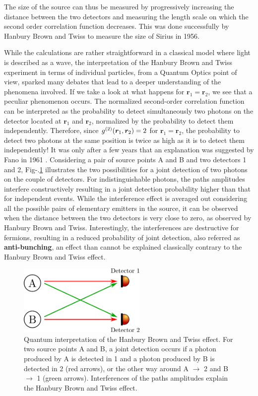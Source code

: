 \noindent The size of the source can thus be measured by progressively increasing the distance between the two detectors and measuring the length scale on which the second order correlation function decreases. This was done successfully by Hanbury Brown and Twiss \cite{brown1956test} to measure the size of Sirius in 1956.

While the calculations are rather straightforward in a classical model where light is described as a wave, the interpretation of the Hanbury Brown and Twiss experiment in terms of individual particles, \ie from a Quantum Optics point of view, sparked many debates that lead to a deeper understanding of the phenomena involved. If we take a look at what happens for $\bm{r}_1=\bm{r}_2$, we see that a peculiar phenomenon occurs. The normalized second-order correlation function can be interpreted as the probability to detect simultaneously two photons on the detector located at $\bm{r}_1$ and $\bm{r}_2$, normalized by the probability to detect them independently. Therefore, since $g^{(2)} (\bm{r}_1,\bm{r}_2)=2$ for $\bm{r}_1=\bm{r}_2$, the probability to detect two photons at the same position is twice as high as it is to detect them independently! It was only after a few years that an explanation was suggested by Fano in 1961 \cite{fano1961quantum}. Considering a pair of source points A and B and two detectors 1 and 2, Fig-.\ref{fig:HBT_scheme} illustrates the two possibilities for a joint detection of two photons on the couple of detectors. For indistinguishable photons, the paths amplitudes interfere constructively resulting in a joint detection probability higher than that for independent events. While the interference effect is averaged out considering all the possible pairs of elementary emitters in the source, it can be observed when the distance between the two detectors is very close to zero, as observed by Hanbury Brown and Twiss. Interestingly, the interferences are destructive for fermions, resulting in a reduced probability of joint detection, also referred as \textbf{anti-bunching}, an effect than cannot be explained classically contrary to the Hanbury Brown and Twiss effect. 

\begin{figure}
    \centering
    \includegraphics[width=0.55\textwidth]{Fig/Chapter1/HBT_scheme.png}
    \caption[Quantum interpretation of the Hanbury Brown and Twiss effect]{Quantum interpretation of the Hanbury Brown and Twiss effect. For two source points A and B, a joint detection occurs if a photon produced by A is detected in 1 and a photon produced by B is detected in 2 (red arrows), or the other way around A $\rightarrow$ 2 and B $\rightarrow$ 1 (green arrows). Interferences of the paths amplitudes explain the Hanbury Brown and Twiss effect.}
    \label{fig:HBT_scheme}
\end{figure}


